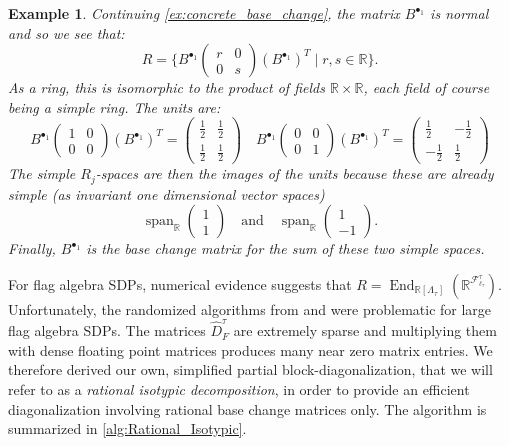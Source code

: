 \documentclass[a4paper,11pt]{article}
\newtheorem{example}[theorem]{Example}
\numberwithin{equation}{section}
\newcommand{\mF}{\mathcal{F}}
\begin{document}
\begin{example}
    Continuing \cref{ex:concrete_base_change}, the matrix $B^{\bullet_1}$ is normal and so we see that:
    \[
        R = \{B^{\bullet_1}\begin{pmatrix}
            r & 0 \\ 0 & s
        \end{pmatrix}(B^{\bullet_1})^T \mid r,s\in\mathbb R \}.
    \]
    As a ring, this is isomorphic to the product of fields $\mathbb R\times\mathbb R$, each field of course being a simple ring. The units are:
    \[
        B^{\bullet_1}\begin{pmatrix}
            1 & 0 \\ 0 & 0
        \end{pmatrix}(B^{\bullet_1})^T
        =
        \begin{pmatrix}
            \frac{1}{2} & \frac{1}{2} \\ \frac{1}{2} & \frac{1}{2}
        \end{pmatrix}
        \quad
        B^{\bullet_1}\begin{pmatrix}
            0 & 0 \\ 0 & 1
        \end{pmatrix}(B^{\bullet_1})^T
        =
        \begin{pmatrix}
            \frac{1}{2} & -\frac{1}{2} \\ -\frac{1}{2} & \frac{1}{2}
        \end{pmatrix}        
    \]
    The simple $R_j$-spaces are then the images of the units because these are already simple (as invariant one dimensional vector spaces)
    \[
        \operatorname{span}_{\mathbb R}
        \begin{pmatrix}
            1 \\ 1
        \end{pmatrix}
        \quad  \text{and} \quad
        \operatorname{span}_{\mathbb R}
        \begin{pmatrix}
            1 \\ -1
        \end{pmatrix}.
    \]
    Finally, $B^{\bullet_1}$ is the base change matrix for the sum of these two simple spaces.
\end{example}

For flag algebra SDPs, numerical evidence suggests that $R=\operatorname{End}_{\mathbb R[\Lambda_\tau]}(\mathbb R^{\mF^\tau_{\ell_\tau}})$. Unfortunately, the randomized algorithms from \cite{Murota_2010} and \cite{Babai_1989} were problematic for large flag algebra SDPs. The matrices $\hat D^\tau_F$ are extremely sparse and multiplying them with dense floating point matrices produces many near zero matrix entries. 
We therefore derived our own, simplified partial block-diagonalization, that we will refer to as a \emph{rational isotypic decomposition}, in order to provide an efficient diagonalization involving rational base change matrices only. The algorithm is summarized in  \cref{alg:Rational_Isotypic}.
\end{document}
